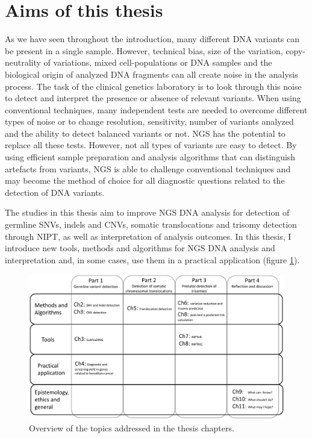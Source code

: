 \section {Aims of this thesis} \label{intro_aims}
As we have seen throughout the introduction, many different DNA variants can be present in a single sample. 
However, technical bias, size of the variation, copy-neutrality of variations, mixed cell-populations or DNA samples and the biological origin of analyzed DNA fragments can all create noise in the analysis process. 
The task of the clinical genetics laboratory is to look through this noise to detect and interpret the presence or absence of relevant variants. 
When using conventional techniques, many independent tests are needed to overcome different types of noise or to change resolution, sensitivity, number of variants analyzed and the ability to detect balanced variants or not. NGS has the potential to replace all these tests. 
However, not all types of variants are easy to detect. 
By using efficient sample preparation and analysis algorithms that can distinguish artefacts from variants, NGS is able to challenge conventional techniques and may become the method of choice for all diagnostic questions related to the detection of DNA variants.

The studies in this thesis aim to improve NGS DNA analysis for detection of germline SNVs, indels and CNVs, somatic translocations and trisomy detection through NIPT, as well as interpretation of analysis outcomes. 
In this thesis, I introduce new tools, methods and algorithms for NGS DNA analysis and interpretation and, in some cases, use them in a practical application (figure \ref{fig:Introduction_Fig3}). 

\begin{figure}
	\includegraphics[width=1.0\linewidth]{img/Introduction_Fig3}
	\caption[Overview of the topics addressed in the thesis chapters ]{Overview of the topics addressed in the thesis chapters.}
	\label{fig:Introduction_Fig3}
\end{figure}

